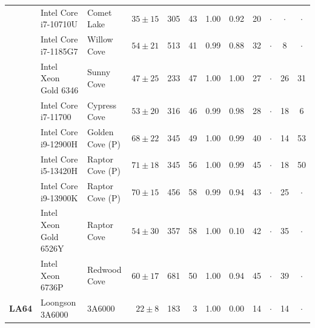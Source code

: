 \begin{tabular}{cll@{\hspace{1em}}rrr@{\hspace{2.5em}}cc@{\hspace{2.5em}}cccc}
 & Intel Core i7-10710U & Comet Lake & $35 \pm 15$ & 305 & 43 & 1.00 & 0.92 & 20 & $\cdot$ & $\cdot$ & $\cdot$ \\\cmidrule(lr){2-12}
 & Intel Core i7-1185G7 & Willow Cove & $54 \pm 21$ & 513 & 41 & 0.99 & 0.88 & 32 & $\cdot$ & 8 & $\cdot$ \\\cmidrule(lr){2-12}
 & Intel Xeon Gold 6346 & Sunny Cove & $47 \pm 25$ & 233 & 47 & 1.00 & 1.00 & 27 & $\cdot$ & 26 & 31 \\\cmidrule(lr){2-12}
 & Intel Core i7-11700 & Cypress Cove & $53 \pm 20$ & 316 & 46 & 0.99 & 0.98 & 28 & $\cdot$ & 18 & 6 \\\cmidrule(lr){2-12}
 & Intel Core i9-12900H & Golden Cove (P) & $68 \pm 22$ & 345 & 49 & 1.00 & 0.99 & 40 & $\cdot$ & 14 & 53 \\\cmidrule(lr){2-12}
 & Intel Core i5-13420H & Raptor Cove (P) & $71 \pm 18$ & 345 & 56 & 1.00 & 0.99 & 45 & $\cdot$ & 18 & 50 \\\cmidrule(lr){2-12}
 & Intel Core i9-13900K & Raptor Cove (P) & $70 \pm 15$ & 456 & 58 & 0.99 & 0.94 & 43 & $\cdot$ & 25 & $\cdot$ \\\cmidrule(lr){2-12}
 & Intel Xeon Gold 6526Y & Raptor Cove & $54 \pm 30$ & 357 & 58 & 1.00 & 0.10 & 42 & $\cdot$ & 35 & $\cdot$ \\\cmidrule(lr){2-12}
 & Intel Xeon 6736P & Redwood Cove & $60 \pm 17$ & 681 & 50 & 1.00 & 0.94 & 45 & $\cdot$ & 39 & $\cdot$ \\\midrule
\multirow[c]{1}{*}{\textbf{LA64}} & Loongson 3A6000 & 3A6000 & $22 \pm 8$ & 183 & 3 & 1.00 & 0.00 & 14 & $\cdot$ & 14 & $\cdot$ \\
\bottomrule
\end{tabular}
